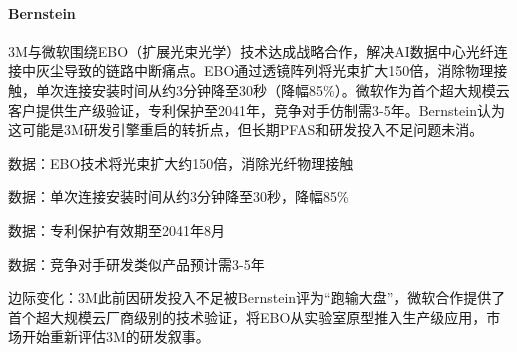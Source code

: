 \documentclass[11pt]{ctexart}
\begin{document}
\paragraph{Bernstein} 3M与微软围绕EBO（扩展光束光学）技术达成战略合作，解决AI数据中心光纤连接中灰尘导致的链路中断痛点。EBO通过透镜阵列将光束扩大150倍，消除物理接触，单次连接安装时间从约3分钟降至30秒（降幅85\%）。微软作为首个超大规模云客户提供生产级验证，专利保护至2041年，竞争对手仿制需3-5年。Bernstein认为这可能是3M研发引擎重启的转折点，但长期PFAS和研发投入不足问题未消。
{\small\color{refgray}数据：EBO技术将光束扩大约150倍，消除光纤物理接触\par}
{\small\color{refgray}数据：单次连接安装时间从约3分钟降至30秒，降幅85\%\par}
{\small\color{refgray}数据：专利保护有效期至2041年8月\par}
{\small\color{refgray}数据：竞争对手研发类似产品预计需3-5年\par}
{\small\color{refgray}边际变化：3M此前因研发投入不足被Bernstein评为“跑输大盘”，微软合作提供了首个超大规模云厂商级别的技术验证，将EBO从实验室原型推入生产级应用，市场开始重新评估3M的研发叙事。\par}
\end{document}
